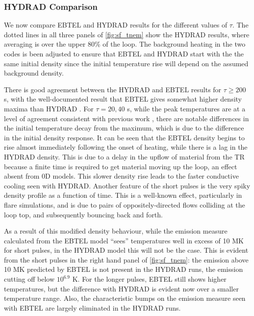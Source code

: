 \documentclass[apj]{emulateapj}
\begin{document}
	\subsubsection{HYDRAD Comparison}
	\label{subsubsec:hydrad_compare}
	\par We now compare EBTEL and HYDRAD results for the different values of $\tau$. The dotted lines in all three panels of \autoref{fig:sf_tnem} show the HYDRAD results, where averaging is over the upper 80\% of the loop. The background heating in the two codes is been adjusted to ensure that EBTEL and HYDRAD start with the the same initial density since the initial temperature rise will depend on the assumed background density.
	\par There is good agreement between the HYDRAD and EBTEL results for $\tau\ge200$ s, with the well-documented result that EBTEL gives somewhat higher density maxima than HYDRAD \citep[see][]{cargill_enthalpy-based_2012}. For $\tau=20,40$ s, while the peak temperatures are at a level of agreement consistent with previous work \citep{cargill_enthalpy-based_2012}, there are notable differences in the initial temperature decay from the maximum, which is due to the difference in the initial density response. It can be seen that the EBTEL density begins to rise almost immediately following the onset of heating, while there is a lag in the HYDRAD density. This is due to a delay in the upflow of material from the TR because a finite time is required to get material moving up the loop, an effect absent from 0D models. This slower density rise leads to the faster conductive cooling seen with HYDRAD. Another feature of the short pulses is the very spiky density profile as a function of time. This is a well-known effect, particularly in flare simulations, and is due to pairs of oppositely-directed flows colliding at the loop top, and subsequently bouncing back and forth.  
	
\par As a result of this modified density behaviour, while the emission measure calculated from the EBTEL model ``sees'' temperatures well in excess of 10 MK for short pulses, in the HYDRAD model this will not be the case. This is evident from the short pulses in the right hand panel of \autoref{fig:sf_tnem}: the emission above 10 MK predicted by EBTEL is not present in the HYDRAD runs, the emission cutting off below $10^{6.9}$ K. For the longer pulses, EBTEL still shows higher temperatures, but the difference with HYDRAD is evident now over a smaller temperature range. Also, the characteristic bumps on the emission measure seen with EBTEL are largely eliminated in the HYDRAD runs.
\end{document}
